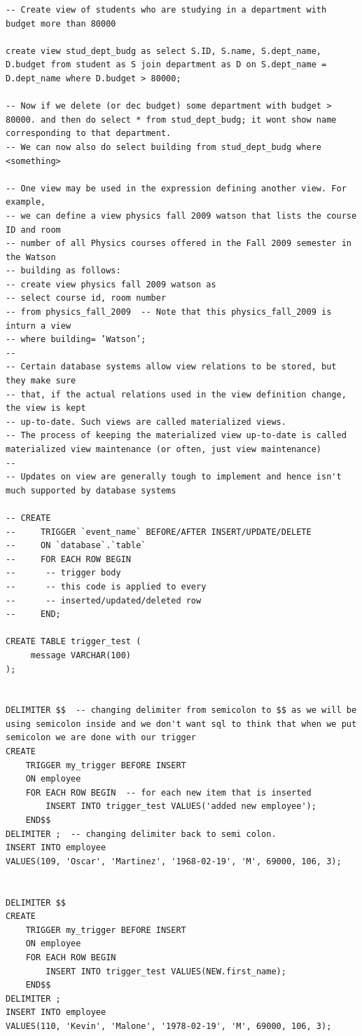 \documentclass[8pt, a4paper, oneside, twocolumn]{extarticle}
\begin{document}
\begin{verbatim}
-- Create view of students who are studying in a department with budget more than 80000

create view stud_dept_budg as select S.ID, S.name, S.dept_name, D.budget from student as S join department as D on S.dept_name = D.dept_name where D.budget > 80000;

-- Now if we delete (or dec budget) some department with budget > 80000. and then do select * from stud_dept_budg; it wont show name corresponding to that department.
-- We can now also do select building from stud_dept_budg where <something>

-- One view may be used in the expression defining another view. For example,
-- we can define a view physics fall 2009 watson that lists the course ID and room
-- number of all Physics courses offered in the Fall 2009 semester in the Watson
-- building as follows:
-- create view physics fall 2009 watson as
-- select course id, room number
-- from physics_fall_2009  -- Note that this physics_fall_2009 is inturn a view
-- where building= ’Watson’;
-- 
-- Certain database systems allow view relations to be stored, but they make sure
-- that, if the actual relations used in the view definition change, the view is kept
-- up-to-date. Such views are called materialized views.
-- The process of keeping the materialized view up-to-date is called materialized view maintenance (or often, just view maintenance) 
-- 
-- Updates on view are generally tough to implement and hence isn't much supported by database systems

-- CREATE
--     TRIGGER `event_name` BEFORE/AFTER INSERT/UPDATE/DELETE
--     ON `database`.`table`
--     FOR EACH ROW BEGIN
-- 		-- trigger body
-- 		-- this code is applied to every
-- 		-- inserted/updated/deleted row
--     END;

CREATE TABLE trigger_test (
     message VARCHAR(100)
);


DELIMITER $$  -- changing delimiter from semicolon to $$ as we will be using semicolon inside and we don't want sql to think that when we put semicolon we are done with our trigger
CREATE
    TRIGGER my_trigger BEFORE INSERT
    ON employee
    FOR EACH ROW BEGIN  -- for each new item that is inserted
        INSERT INTO trigger_test VALUES('added new employee');
    END$$
DELIMITER ;  -- changing delimiter back to semi colon.
INSERT INTO employee
VALUES(109, 'Oscar', 'Martinez', '1968-02-19', 'M', 69000, 106, 3);


DELIMITER $$
CREATE
    TRIGGER my_trigger BEFORE INSERT
    ON employee
    FOR EACH ROW BEGIN
        INSERT INTO trigger_test VALUES(NEW.first_name);
    END$$
DELIMITER ;
INSERT INTO employee
VALUES(110, 'Kevin', 'Malone', '1978-02-19', 'M', 69000, 106, 3);


\end{verbatim}
\end{document}
